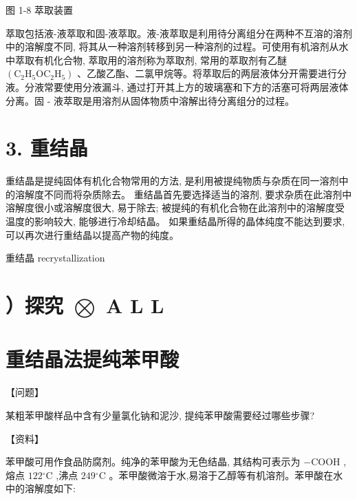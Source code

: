 \documentclass[10pt]{article}
\begin{document}
图 1-8 萃取装置

萃取包括液-液萃取和固-液萃取。液-液萃取是利用待分离组分在两种不互溶的溶剂中的溶解度不同, 将其从一种溶剂转移到另一种溶剂的过程。可使用有机溶剂从水中萃取有机化合物, 萃取用的溶剂称为萃取剂, 常用的萃取剂有乙醚 \(\left( {{\mathrm{C}}_{2}{\mathrm{H}}_{5}{\mathrm{{OC}}}_{2}{\mathrm{H}}_{5}}\right)\) 、乙酸乙酯、二氯甲烷等。将萃取后的两层液体分开需要进行分液。分液常要使用分液漏斗, 通过打开其上方的玻璃塞和下方的活塞可将两层液体分离。固 - 液萃取是用溶剂从固体物质中溶解出待分离组分的过程。

\section*{3. 重结晶}

重结晶是提纯固体有机化合物常用的方法, 是利用被提纯物质与杂质在同一溶剂中的溶解度不同而将杂质除去。 重结晶首先要选择适当的溶剂, 要求杂质在此溶剂中溶解度很小或溶解度很大, 易于除去; 被提纯的有机化合物在此溶剂中的溶解度受温度的影响较大, 能够进行冷却结晶。 如果重结晶所得的晶体纯度不能达到要求, 可以再次进行重结晶以提高产物的纯度。

\begin{mdframed}

重结晶 recrystallization

\end{mdframed}

\section*{）探究 \(\bigotimes\) A L L}

\section*{重结晶法提纯苯甲酸}

【问题】

某粗苯甲酸样品中含有少量氯化钠和泥沙, 提纯苯甲酸需要经过哪些步骤?

【资料】

苯甲酸可用作食品防腐剂。纯净的苯甲酸为无色结晶, 其结构可表示为 \(- \mathrm{{COOH}}\) ,熔点 \({122}{}^{ \circ }\mathrm{C}\) ,沸点 \({249}{}^{ \circ }\mathrm{C}\) 。苯甲酸微溶于水,易溶于乙醇等有机溶剂。苯甲酸在水中的溶解度如下:

\begin{center}
\end{center}
\end{document}

